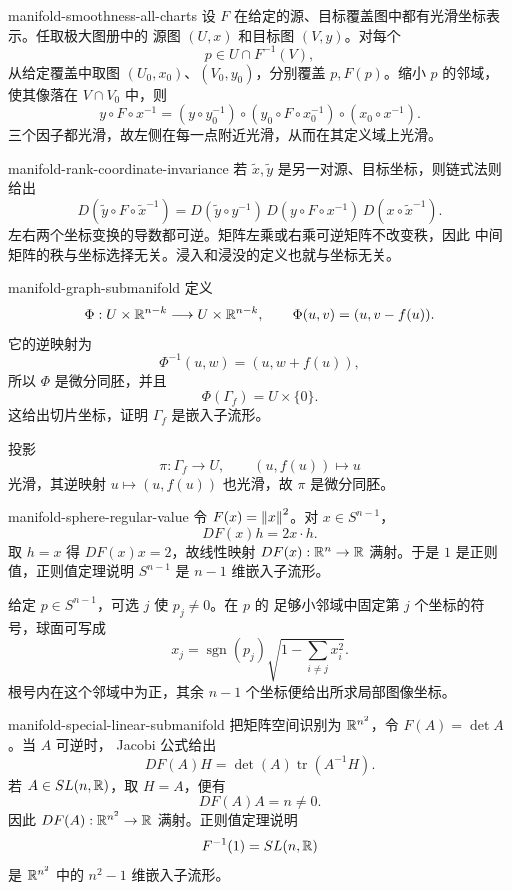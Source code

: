 \begin{solution}{manifold-smoothness-all-charts}
设 \(F\) 在给定的源、目标覆盖图中都有光滑坐标表示。任取极大图册中的
源图 \((U,x)\) 和目标图 \((V,y)\)。对每个
\[
 p\in U\cap F^{-1}(V),
\]
从给定覆盖中取图 \((U_0,x_0)\)、\((V_0,y_0)\)，分别覆盖
\(p,F(p)\)。缩小 \(p\) 的邻域，使其像落在 \(V\cap V_0\) 中，则
\[
 y\circ F\circ x^{-1}
 =(y\circ y_0^{-1})\circ
  (y_0\circ F\circ x_0^{-1})\circ
  (x_0\circ x^{-1}).
\]
三个因子都光滑，故左侧在每一点附近光滑，从而在其定义域上光滑。
\end{solution}

\begin{solution}{manifold-rank-coordinate-invariance}
若 \(\widetilde x,\widetilde y\) 是另一对源、目标坐标，则链式法则给出
\[
 D(\widetilde y\circ F\circ\widetilde x^{-1})
 =D(\widetilde y\circ y^{-1})\,
  D(y\circ F\circ x^{-1})\,
  D(x\circ\widetilde x^{-1}).
\]
左右两个坐标变换的导数都可逆。矩阵左乘或右乘可逆矩阵不改变秩，因此
中间矩阵的秩与坐标选择无关。浸入和浸没的定义也就与坐标无关。
\end{solution}

\begin{solution}{manifold-graph-submanifold}
定义
\[
 \Phi:U\times\mathbb{R}^{n-k}\longrightarrow U\times\mathbb{R}^{n-k},\qquad
 \Phi(u,v)=(u,v-f(u)).
\]
它的逆映射为
\[
 \Phi^{-1}(u,w)=(u,w+f(u)),
\]
所以 \(\Phi\) 是微分同胚，并且
\[
 \Phi(\Gamma_f)=U\times\{0\}.
\]
这给出切片坐标，证明 \(\Gamma_f\) 是嵌入子流形。

投影
\[
 \pi:\Gamma_f\longrightarrow U,\qquad (u,f(u))\longmapsto u
\]
光滑，其逆映射 \(u\mapsto(u,f(u))\) 也光滑，故 \(\pi\) 是微分同胚。
\end{solution}

\begin{solution}{manifold-sphere-regular-value}
令 \(F(x)=\left\lVert x\right\rVert^2\)。对 \(x\in S^{n-1}\)，
\[
 DF(x)h=2x\cdot h.
\]
取 \(h=x\) 得 \(DF(x)x=2\)，故线性映射
\(DF(x):\mathbb{R}^n\to\mathbb{R}\) 满射。于是 \(1\) 是正则值，正则值定理说明
\(S^{n-1}\) 是 \(n-1\) 维嵌入子流形。

给定 \(p\in S^{n-1}\)，可选 \(j\) 使 \(p_j\ne0\)。在 \(p\) 的
足够小邻域中固定第 \(j\) 个坐标的符号，球面可写成
\[
 x_j=\operatorname{sgn}(p_j)
 \sqrt{1-\sum_{i\ne j}x_i^2}.
\]
根号内在这个邻域中为正，其余 \(n-1\) 个坐标便给出所求局部图像坐标。
\end{solution}

\begin{solution}{manifold-special-linear-submanifold}
把矩阵空间识别为 \(\mathbb{R}^{n^2}\)，令 \(F(A)=\det A\)。当 \(A\) 可逆时，
Jacobi 公式给出
\[
 DF(A)H=\det(A)\operatorname{tr}(A^{-1}H).
\]
若 \(A\in SL(n,\mathbb{R})\)，取 \(H=A\)，便有
\[
 DF(A)A=n\ne0.
\]
因此 \(DF(A):\mathbb{R}^{n^2}\to\mathbb{R}\) 满射。正则值定理说明
\[
 F^{-1}(1)=SL(n,\mathbb{R})
\]
是 \(\mathbb{R}^{n^2}\) 中的 \(n^2-1\) 维嵌入子流形。
\end{solution}


